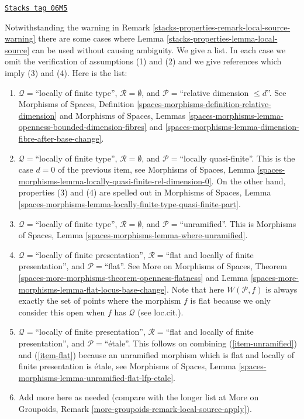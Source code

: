 \begin{remark}
\label{stacks-properties-remark-local-source-apply}
\href{https://stacks.math.columbia.edu/tag/06M5}{\texttt{Stacks tag 06M5}}

Notwithstanding the warning in
Remark \ref{stacks-properties-remark-local-source-warning}
there are some cases where
Lemma \ref{stacks-properties-lemma-local-source}
can be used without causing ambiguity.
We give a list. In each case we omit the verification of
assumptions (1) and (2) and we give references which imply
(3) and (4). Here is the list:
\begin{enumerate}
\item
\label{stacks-properties-item-rel-dim-leq-d}
$\mathcal{Q} = $``locally of finite type'', $\mathcal{R} = \emptyset$,
and $\mathcal{P} =$``relative dimension $\leq d$''.
See
Morphisms of Spaces,
Definition \ref{spaces-morphisms-definition-relative-dimension}
and
Morphisms of Spaces, Lemmas
\ref{spaces-morphisms-lemma-openness-bounded-dimension-fibres} and
\ref{spaces-morphisms-lemma-dimension-fibre-after-base-change}.
\item
\label{stacks-properties-item-loc-quasi-finite}
$\mathcal{Q} =$``locally of finite type'', $\mathcal{R} = \emptyset$,
and $\mathcal{P} =$``locally quasi-finite''.
This is the case $d = 0$ of the previous item, see
Morphisms of Spaces, Lemma
\ref{spaces-morphisms-lemma-locally-quasi-finite-rel-dimension-0}.
On the other hand, properties (3) and (4) are spelled out in
Morphisms of Spaces, Lemma
\ref{spaces-morphisms-lemma-locally-finite-type-quasi-finite-part}.
\item
\label{stacks-properties-item-unramified}
$\mathcal{Q} = $``locally of finite type'', $\mathcal{R} = \emptyset$,
and $\mathcal{P} =$``unramified''. This is
Morphisms of Spaces, Lemma \ref{spaces-morphisms-lemma-where-unramified}.
\item
\label{stacks-properties-item-flat}
$\mathcal{Q} =$``locally of finite presentation'',
$\mathcal{R} =$``flat and locally of finite presentation'', and
$\mathcal{P} =$``flat''. See
More on Morphisms of Spaces, Theorem
\ref{spaces-more-morphisms-theorem-openness-flatness} and
Lemma \ref{spaces-more-morphisms-lemma-flat-locus-base-change}.
Note that here $W(\mathcal{P}, f)$ is always exactly the set of points
where the morphism $f$ is flat because we only consider this open
when $f$ has $\mathcal{Q}$ (see loc.cit.).
\item
\label{stacks-properties-item-etale}
$\mathcal{Q} =$``locally of finite presentation'',
$\mathcal{R} =$``flat and locally of finite presentation'', and
$\mathcal{P}=$``\'etale''. This follows on combining
(\ref{item-unramified}) and (\ref{item-flat}) because an unramified
morphism which is flat and locally of finite presentation is \'etale, see
Morphisms of Spaces,
Lemma \ref{spaces-morphisms-lemma-unramified-flat-lfp-etale}.
\item Add more here as needed (compare with the longer list at
More on Groupoids, Remark \ref{more-groupoids-remark-local-source-apply}).
\end{enumerate}
\end{remark}

